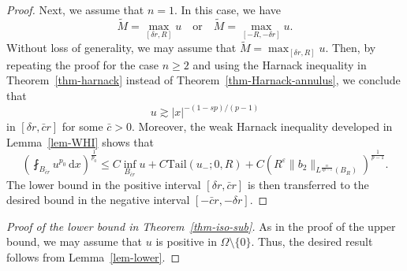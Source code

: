 \documentclass[11pt]{amsart}
\theoremstyle{plain}
\theoremstyle{definition}
\numberwithin{equation}{section}
\begin{document}
\begin{proof}
Next, we assume that $n=1$. In this case, we have
\begin{equation*}
    \widetilde{M} = \max_{[\delta r, R]} u \quad\text{or}\quad \widetilde{M} = \max_{[-R, -\delta r]} u.
\end{equation*}
Without loss of generality, we may assume that $\widetilde{M} = \max_{[\delta r, R]} u$. Then, by repeating the proof for the case $n\geq 2$ and using the Harnack inequality in Theorem~\ref{thm-harnack} instead of Theorem~\ref{thm-Harnack-annulus}, we conclude that
\begin{equation*}
    u \gtrsim |x|^{-(1-sp)/(p-1)}
\end{equation*}
in $[\delta r, \bar{c} r]$ for some $\bar{c}>0$. Moreover, the weak Harnack inequality developed in Lemma~\ref{lem-WHI} shows that
\begin{equation*}
	\left(\fint_{B_{\bar{c} r}} u^{p_0}\,\mathrm{d}x\right)^{\frac{1}{p_0}} \leq C \inf_{B_{\bar{c} r}} u+C \mathrm{Tail}(u_-; 0, R) + C\left( R^\varepsilon \|b_2\|_{L^{\frac{n}{sp-\varepsilon}}(B_R)} \right)^{\frac{1}{p-1}}.
\end{equation*}
The lower bound in the positive interval $[\delta r, \bar{c}r]$ is then transferred to the desired bound in the negative interval $[-\bar{c}r, -\delta r]$.
\end{proof}



\begin{proof}[Proof of the lower bound in Theorem~\ref{thm-iso-sub}]
As in the proof of the upper bound, we may assume that $u$ is positive in $\Omega \setminus \{0\}$. Thus, the desired result follows from Lemma~\ref{lem-lower}.
\end{proof}
\end{document}
